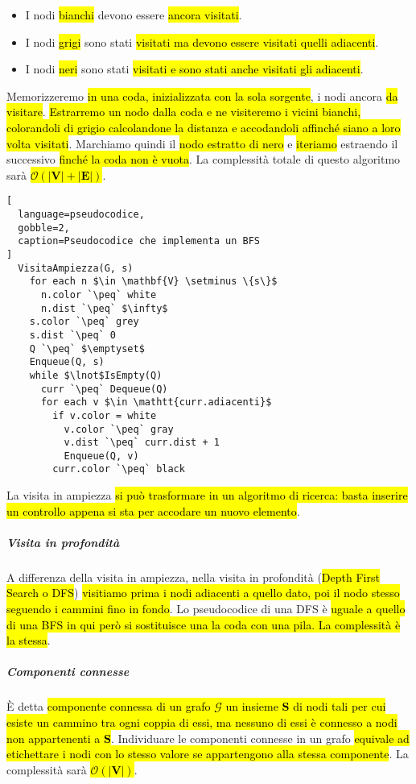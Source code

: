\documentclass[a4paper,11pt,oneside]{article}
\theoremstyle{plain}
\theoremstyle{definition}
\theoremstyle{remark}
\newcommand{\peq}{$\gets$}
\begin{document}
\begin{itemize}
  \item I nodi \hl{bianchi} devono essere \hl{ancora visitati}.
  \item I nodi \hl{grigi} sono stati \hl{visitati ma devono essere visitati
    quelli adiacenti}.
  \item I nodi \hl{neri} sono stati \hl{visitati e sono stati anche visitati gli
    adiacenti}.
\end{itemize}

\noindent Memorizzeremo \hl{in una coda, inizializzata con la sola sorgente}, i
nodi ancora \hl{da visitare}. \hl{Estrarremo un nodo dalla coda e ne visiteremo
i vicini bianchi, colorandoli di grigio calcolandone la distanza e accodandoli
affinché siano a loro volta visitati}. Marchiamo quindi il \hl{nodo estratto di
nero} e \hl{iteriamo} estraendo il successivo \hl{finché la coda non è vuota}.
La complessità totale di questo algoritmo sarà \hl{$\mathcal{O}(|\mathbf{V}| +
|\mathbf{E}|)$}.

\begin{lstlisting}[
  language=pseudocodice,
  gobble=2,
  caption=Pseudocodice che implementa un BFS
]
  VisitaAmpiezza(G, s)
    for each n $\in \mathbf{V} \setminus \{s\}$
      n.color `\peq` white
      n.dist `\peq` $\infty$
    s.color `\peq` grey
    s.dist `\peq` 0
    Q `\peq` $\emptyset$
    Enqueue(Q, s)
    while $\lnot$IsEmpty(Q)
      curr `\peq` Dequeue(Q)
      for each v $\in \mathtt{curr.adiacenti}$
        if v.color = white
          v.color `\peq` gray
          v.dist `\peq` curr.dist + 1
          Enqueue(Q, v)
        curr.color `\peq` black
\end{lstlisting}

\noindent La visita in ampiezza \hl{si può trasformare in un algoritmo di
ricerca: basta inserire un controllo appena si sta per accodare un nuovo
elemento}.

\subparagraph{Visita in profondità} A differenza della visita in ampiezza, nella
visita in profondità (\hl{Depth First Search o DFS}) \hl{visitiamo prima i nodi
adiacenti a quello dato, poi il nodo stesso seguendo i cammini fino in fondo}.
Lo pseudocodice di una DFS è \hl{uguale a quello di una BFS in qui però si
sostituisce una la coda con una pila. La complessità è la stessa}.

\subparagraph{Componenti connesse} È detta \hl{componente connessa di un grafo
$\mathcal{G}$ un insieme $\mathbf{S}$ di nodi tali per cui esiste un cammino
tra ogni coppia di essi, ma nessuno di essi è connesso a nodi non appartenenti a
$\mathbf{S}$}. Individuare le componenti connesse in un grafo \hl{equivale ad
etichettare i nodi con lo stesso valore se appartengono alla stessa componente}.
La complessità sarà \hl{$\mathcal{O}(|\mathbf{V}|)$}.
\end{document}
